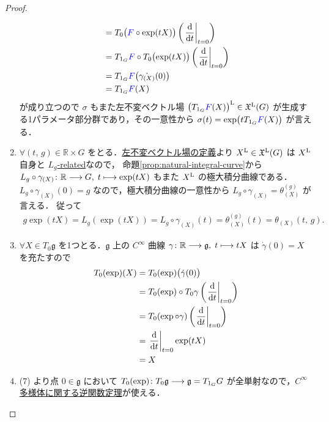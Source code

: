 \documentclass[geometry_main]{subfiles}
\begin{document}
\begin{proof}
\begin{enumerate}
\begin{align}
            &= T_{0} \bigl( \textcolor{blue}{F} \circ \exp (tX) \bigr) \left( \eval{\dv{}{t}}_{t=0} \right) \\
            &= T_{1_G} \textcolor{blue}{F} \circ T_0 \bigl( \exp (tX)  \bigr)  \left( \eval{\dv{}{t}}_{t=0} \right) \\
            &= T_{1_G} \textcolor{blue}{F} \bigl( \dot{\gamma_{(X)}}(0) \bigr) \\
            &= T_{1_G} \textcolor{blue}{F} (X)
        \end{align}
        が成り立つので $\sigma$ もまた左不変ベクトル場 $\bigl(T_{1_G} \textcolor{blue}{F} (X)\bigr)^{\mathrm{L}} \in \mathfrak{X}^{\mathrm{L}}(G)$  が生成する1パラメータ部分群であり，その一意性から $\sigma(t) = \exp \bigl( t T_{1_G} \textcolor{blue}{F} (X) \bigr)$ が言える．
        \item $\forall (t,\, g) \in \mathbb{R} \times G$ をとる．\hyperref[def:left-invariant]{左不変ベクトル場の定義}より $X^{\mathrm{L}} \in \mathfrak{X}^{\mathrm{L}}(G)$ は $X^{\mathrm{L}}$ 自身と \hyperref[def:F-related]{$L_g$-related}なので，
        命題\ref{prop:natural-integral-curve}から $L_g \circ \gamma_{(X)} \colon \mathbb{R} \longrightarrow G,\; t \longmapsto \exp (tX)$ もまた $X^{\mathrm{L}}$ の極大積分曲線である．$L_g \circ \gamma_{(X)}(0) = g$ なので，極大積分曲線の一意性から $L_g \circ \gamma_{(X)} = \theta_{(X)}^{(g)}$ が言える．
        従って
        \begin{align}
            g \exp(tX) = L_g(\exp(tX)) = L_g \circ \gamma_{(X)}(t) = \theta_{(X)}^{(g)}(t) = \theta_{(X)} (t,\, g).
        \end{align}

        \item $\forall X \in T_0 \mathfrak{g}$ を1つとる．$\mathfrak{g}$ 上の $C^\infty$ 曲線 $\gamma \colon \mathbb{R} \longrightarrow \mathfrak{g},\; t \longmapsto t X$ は $\dot{\gamma}(0) = X$ を充たすので
        \begin{align}
            T_0 (\exp)(X)
            &= T_0(\exp) \bigl( \dot{\gamma}(0) \bigr) \\
            &= T_0 (\exp) \circ T_0 \gamma \left( \eval{\dv{}{t}}_{t=0} \right) \\
            &= T_0 (\exp \circ \gamma)  \left( \eval{\dv{}{t}}_{t=0} \right) \\
            &= \eval{\dv{}{t}}_{t=0} \exp(tX) \\
            &= X
        \end{align}
        
        \item (7) より点 $0 \in \mathfrak{g}$ において $T_0 (\exp) \colon T_0 \mathfrak{g} \longrightarrow \mathfrak{g} = T_{1_G} G$ が全単射なので，\hyperref[thm:inverse-function-b]{$C^\infty$ 多様体に関する逆関数定理}が使える．
    \end{enumerate}
\end{proof}
\end{document}

